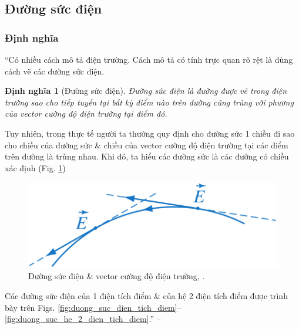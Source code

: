 \documentclass[oneside]{book}
\numberwithin{equation}{section}
\newtheorem{dinhnghia}{Định nghĩa}[section]
\begin{document}
\subsection{Đường sức điện}

\subsubsection{Định nghĩa}
``Có nhiều cách mô tả điện trường. Cách mô tả có tính trực quan rõ rệt là dùng cách vẽ các đường sức điện.

\begin{dinhnghia}[Đường sức điện]
	\emph{Đường sức điện} là đường được vẽ trong điện trường sao cho tiếp tuyến tại bất kỳ điểm nào trên đường cũng trùng với phương của vector cường độ điện trường tại điểm đó.
\end{dinhnghia}
Tuy nhiên, trong thực tế người ta thường quy định cho đường sức 1 chiều đi sao cho chiều của đường sức \& chiều của vector cường độ điện trường tại các điểm trên đường là trùng nhau. Khi đó, ta hiểu các đường sức là các đường có chiều xác định (Fig. \ref{fig:duong_suc_dien})

\begin{figure}[H]
	\centering
	\includegraphics[scale=0.15]{duong_suc_dien}
	\caption{Đường sức điện \& vector cường độ điện trường, \cite[Hình 3.2, p. 15]{SGK_Vat_Ly_11_nang_cao}.}
	\label{fig:duong_suc_dien}
\end{figure}
Các đường sức điện của 1 điện tích điểm \& của hệ 2 điện tích điểm được trình bày trên Figs. \ref{fig:duong_suc_dien_tich_diem}--\ref{fig:duong_suc_he_2_dien_tich_diem}.'' --  \cite[pp. 14--15]{SGK_Vat_Ly_11_nang_cao}
\end{document}
